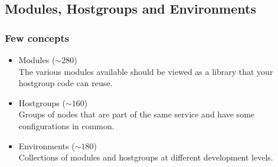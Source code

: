 \documentclass[aspectratio=169]{beamer}
\begin{document}
\subsection{Modules, Hostgroups and Environments}
\begin{frame}

    \frametitle{Few concepts}
    \begin{itemize}
        \item Modules ($\sim 280$) \\

        The various modules available should be viewed as a library
        that your hostgroup code can reuse.
        \newline
        \item Hostgroups ($\sim 160$) \\

        Groups of nodes that are part of the same service and have
        some configurations in common.
        \newline
        \item Environments ($\sim 180$) \\

        Collections of modules and hostgroups at different development levels.
    \end{itemize}

\end{frame}

\end{document}
